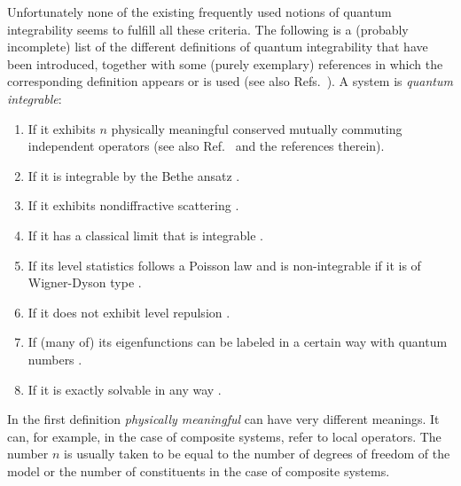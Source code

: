 \documentclass[a4paper,12pt,listof=totoc,index=totoc,bibliography=totoc,headsepline=false,headings=normal,BCOR16.153846mm,DIV12,headinclude,twoside,cleardoublepage=empty,numbers=noenddot,final]{scrreprt}
\theoremstyle{mystyle}
\numberwithin{equation}{section}
\numberwithin{figure}{section}
\numberwithin{lemma}{section}
\numberwithin{theorem}{section}
\numberwithin{corollary}{section}
\numberwithin{definition}{section}
\numberwithin{conjecture}{section}
\numberwithin{observation}{section}
\newcommand{\+}{\mkern2mu}
\DeclareMathOperator{\1}{\mathds{1}}
\begin{document}
Unfortunately none of the existing frequently used notions of quantum integrability seems to fulfill all these criteria. 
The following is a (probably incomplete) list of the different definitions of quantum integrability that have been introduced, together with some (purely exemplary) references in which the corresponding definition appears or is used (see also Refs.~\cite{1012.3587v1,PhysRevLett.10-6,sutherland04,Weigert1992}).
A system is \emph{quantum integrable}:
\begin{enumerate}[leftmargin=*]
\item \label{item:npotionsofintegrability_conservedquantity} If it exhibits $n$ physically meaningful conserved mutually commuting independent operators \cite{Rigol07,Braak11,1109.5904v1,Barthel08,Hawkins2008,Jensen1985} (see also Ref.~\cite{Weigert1992} and the references therein).
\item \label{item:npotionsofintegrability_betheansatz} If it is integrable by the Bethe ansatz \cite{sutherland04,Ikeda2013a,Beugeling2013}.
\item \label{item:npotionsofintegrability_nondiffractive} If it exhibits nondiffractive scattering \cite{sutherland04}.
\item \label{item:npotionsofintegrability_classicallimit} If it has a classical limit that is integrable \cite{Castagnino2006}.
\item \label{item:npotionsofintegrability_levelstatistics} If its level statistics follows a Poisson law and is non-integrable if it is of Wigner-Dyson type \cite{Casati1985,1103.0787v1,PhysRevB.82.17,Znidari2013,1111.3375v1,Atas12,Tabor1989,Bohigas1984,Fine2013,Jensen1985}.
\item \label{item:npotionsofintegrability_nolevelrepulsion} If it does not exhibit level repulsion \cite{Stepanov2008,Berry1977a}.
\item \label{item:npotionsofintegrability_quantumnumbers} If (many of) its eigenfunctions can be labeled in a certain way with quantum numbers \cite{Braak11,Berry1977a}.
\item \label{item:npotionsofintegrability_exaxclysolvable} If it is exactly solvable in any way \cite{Beugeling2013,Fendley1995,Braak11,Jensen1985}.
\end{enumerate}
In the first definition \emph{physically meaningful} can have very different meanings.
It can, for example, in the case of composite systems, refer to local operators.
The number $n$ is usually taken to be equal to the number of degrees of freedom of the model or the number of constituents in the case of composite systems.
\end{document}
